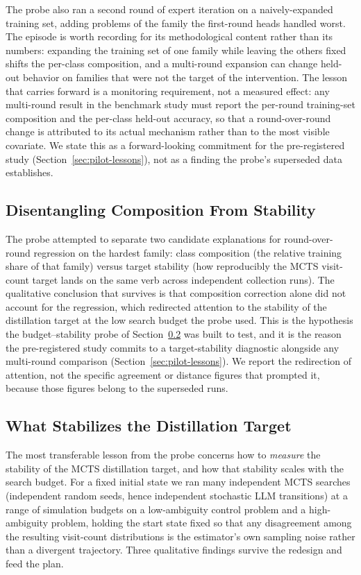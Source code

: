 The probe also ran a second round of expert iteration on a naively-expanded
training set, adding problems of the family the first-round heads handled worst.
The episode is worth recording for its methodological content rather than its
numbers: expanding the training set of one family while leaving the others fixed
shifts the per-class composition, and a multi-round expansion can change
held-out behavior on families that were not the target of the intervention. The
lesson that carries forward is a monitoring requirement, not a measured effect:
any multi-round result in the benchmark study must report the per-round
training-set composition and the per-class held-out accuracy, so that a
round-over-round change is attributed to its actual mechanism rather than to the
most visible covariate. We state this as a forward-looking commitment for the
pre-registered study (Section~\ref{sec:pilot-lessons}), not as a finding the
probe's superseded data establishes.

\subsection{Disentangling Composition From Stability}
\label{sec:pilot-v4b}

The probe attempted to separate two candidate explanations for round-over-round
regression on the hardest family: class composition (the relative training share
of that family) versus target stability (how reproducibly the MCTS visit-count
target lands on the same verb across independent collection runs). The
qualitative conclusion that survives is that composition correction alone did
not account for the regression, which redirected attention to the stability of
the distillation target at the low search budget the probe used. This is the
hypothesis the budget--stability probe of Section~\ref{sec:pilot-bsweep} was
built to test, and it is the reason the pre-registered study commits to a
target-stability diagnostic alongside any multi-round comparison
(Section~\ref{sec:pilot-lessons}). We report the redirection of attention, not
the specific agreement or distance figures that prompted it, because those
figures belong to the superseded runs.

\subsection{What Stabilizes the Distillation Target}
\label{sec:pilot-bsweep}

The most transferable lesson from the probe concerns how to \emph{measure} the
stability of the MCTS distillation target, and how that stability scales with
the search budget. For a fixed initial state we ran many independent MCTS
searches (independent random seeds, hence independent stochastic LLM
transitions) at a range of simulation budgets on a low-ambiguity control problem
and a high-ambiguity problem, holding the start state fixed so that any
disagreement among the resulting visit-count distributions is the estimator's
own sampling noise rather than a divergent trajectory. Three qualitative
findings survive the redesign and feed the plan.

